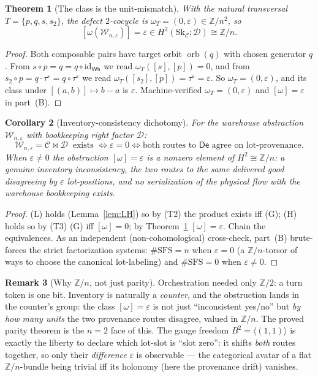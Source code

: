 \documentclass[11pt]{article}
\newtheorem{theorem}{Theorem}
\newtheorem{corollary}[theorem]{Corollary}
\theoremstyle{definition}
\newtheorem{remark}[theorem]{Remark}
\newcommand{\id}{\mathrm{id}}
\newcommand{\C}{\mathcal{C}}
\newcommand{\D}{\mathcal{D}}
\newcommand{\W}{\mathcal{W}}
\newcommand{\Sk}{\mathrm{Sk}}
\newcommand{\orb}{\operatorname{orb}}
\newcommand{\Wh}{\mathsf{Wh}}
\newcommand{\De}{\mathsf{De}}
\newcommand{\Zn}{\mathbb{Z}/n}
\begin{document}
\begin{theorem}[The class is the unit-mismatch]\label{thm:main}
With the natural transversal $T=\{p,q,s,s_2\}$, the defect $2$-cocycle is
$\omega_T=(0,\varepsilon)\in\Zn^2$, so
\[
   [\omega(\W_{n,\varepsilon})]=\varepsilon\in H^2(\Sk_\C;\D)\cong\Zn .
\]
\end{theorem}
\begin{proof}
Both composable pairs have target orbit $\orb(q)$ with chosen generator $q$. From
$s\circ p=q=q\circ\id_\Wh$ we read $\omega_T([s],[p])=0$, and from $s_2\circ p=
q\cdot\tau^\varepsilon=q\circ\tau^\varepsilon$ we read
$\omega_T([s_2],[p])=\tau^\varepsilon=\varepsilon$. So $\omega_T=(0,\varepsilon)$, and
its class under $[(a,b)]\mapsto b-a$ is $\varepsilon$. Machine-verified
$\omega_T=(0,\varepsilon)$ and $[\omega]=\varepsilon$ in part~(B).
\end{proof}

\begin{corollary}[Inventory-consistency dichotomy]\label{cor:main}
For the warehouse abstraction $\W_{n,\varepsilon}$ with bookkeeping right factor $\D$:
\[
   \W_{n,\varepsilon}=\C\bowtie\D \ \text{ exists }\iff \varepsilon=0
   \iff \text{both routes to $\De$ agree on lot-provenance.}
\]
When $\varepsilon\ne0$ the obstruction $[\omega]=\varepsilon$ is a nonzero element of
$H^2\cong\Zn$: a genuine \emph{inventory inconsistency}, the two routes to the same
delivered good disagreeing by $\varepsilon$ lot-positions, and no serialization of the
physical flow with the warehouse bookkeeping exists.
\end{corollary}
\begin{proof}
(L) holds (Lemma~\ref{lem:LH}) so by (T2) the product exists iff (G); (H) holds so by
(T3) (G) iff $[\omega]=0$; by Theorem~\ref{thm:main} $[\omega]=\varepsilon$. Chain the
equivalences. As an independent (non-cohomological) cross-check, part~(B) brute-forces
the strict factorization systems: $\#\mathrm{SFS}=n$ when $\varepsilon=0$ (a
$\Zn$-torsor of ways to choose the canonical lot-labeling) and $\#\mathrm{SFS}=0$ when
$\varepsilon\ne0$.
\end{proof}

\begin{remark}[Why $\Zn$, not just parity]
Orchestration \cite{orch} needed only $\mathbb Z/2$: a turn token is one bit. Inventory
is naturally a \emph{counter}, and the obstruction lands in the counter's group: the
class $[\omega]=\varepsilon$ is not just ``inconsistent yes/no'' but \emph{by how many
units} the two provenance routes disagree, valued in $\Zn$. The proved parity theorem
is the $n=2$ face of this. The gauge freedom $B^2=\langle(1,1)\rangle$ is exactly the
liberty to declare which lot-slot is ``slot zero'': it shifts \emph{both} routes
together, so only their \emph{difference} $\varepsilon$ is observable --- the
categorical avatar of a flat $\Zn$-bundle being trivial iff its holonomy (here the
provenance drift) vanishes.
\end{remark}
\end{document}
